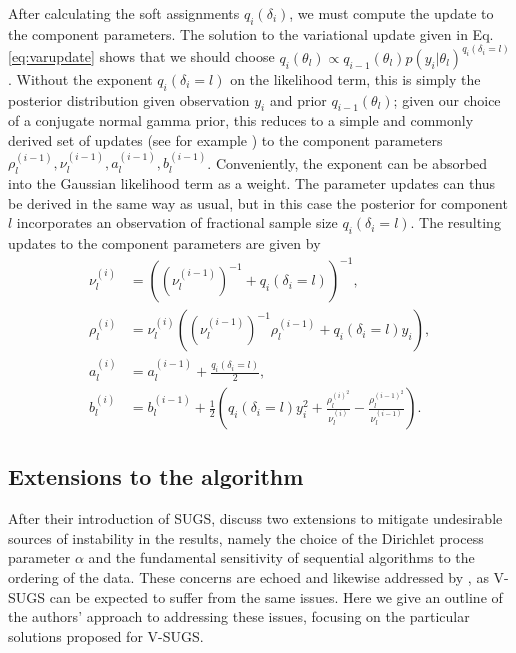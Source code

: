 \documentclass{uwstat572}
\begin{document}
After calculating the soft assignments $q_i(\delta_i)$, we must compute the update to the component parameters. The solution to the variational update given in Eq. \ref{eq:varupdate} shows that we should choose $q_i(\theta_l) \propto q_{i-1}(\theta_l) p(y_i | \theta_l)^{q_i(\delta_i = l)}$. Without the exponent $q_i(\delta_i = l)$ on the likelihood term, this is simply the posterior distribution given observation $y_i$ and prior $q_{i-1}(\theta_l)$; given our choice of a conjugate normal gamma prior, this reduces to a simple and commonly derived set of updates (see for example \cite{bishop}) to the component parameters $\rho_{l}^{(i-1)}, \nu_{l}^{(i-1)}, a_{l}^{(i-1)}, b_{l}^{(i-1)}$. Conveniently, the exponent can be absorbed into the Gaussian likelihood term as a weight. The parameter updates can thus be derived in the same way as usual, but in this case the posterior for component $l$ incorporates an observation of fractional sample size $q_i(\delta_i = l)$. The resulting updates to the component parameters are given by
\begin{align}
\nu_{l}^{(i)} &= ((\nu_{l}^{(i-1)})^{-1}+q_i(\delta_i = l))^{-1}, \label{eq:update1} \\
\rho_{l}^{(i)} &= \nu_{l}^{(i)}((\nu_{l}^{(i-1)})^{-1}\rho_{l}^{(i-1)}+q_i(\delta_i = l)y_i), \label{eq:update2} \\
a_{l}^{(i)} &= a_{l}^{(i-1)} + \frac{q_i(\delta_i = l)}{2}, \label{eq:update3} \\
b_{l}^{(i)} &= b_{l}^{(i-1)} + \frac{1}{2}\left(q_i(\delta_i = l)y_i^2 + \frac{\rho_{l}^{(i)^2}}{\nu_{l}^{(i)}} - \frac{\rho_{l}^{(i-1)^2}}{\nu_{l}^{(i-1)}} \right). \label{eq:update4}
\end{align}

\subsection{Extensions to the algorithm}

After their introduction of SUGS, \cite{wang} discuss two extensions to mitigate undesirable sources of instability in the results, namely the choice of the Dirichlet process parameter $\alpha$ and the fundamental sensitivity of sequential algorithms to the ordering of the data.  These concerns are echoed and likewise addressed by \cite{zhang}, as V-SUGS can be expected to suffer from the same issues. Here we give an outline of the authors' approach to addressing these issues, focusing on the particular solutions proposed for V-SUGS.
\end{document}
